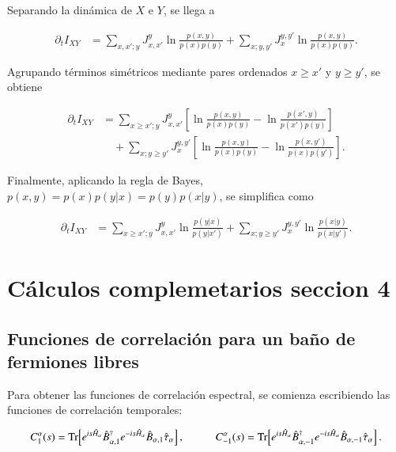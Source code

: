 \begin{appendixs}
Separando la dinámica de \(X\) e \(Y\), se llega a

\begin{align*}
    \partial_{t} I_{XY} 
    &= \sum_{x,x';y} J_{x,x'}^{y} \ln \frac{p(x,y)}{p(x)p(y)} 
    + \sum_{x;y,y'} J_{x}^{y,y'} \ln \frac{p(x,y)}{p(x)p(y)}.
\end{align*}

Agrupando términos simétricos mediante pares ordenados \(x \geq x'\) y \(y \geq y'\), se obtiene

\begin{align*}
    \partial_{t} I_{XY} 
    &= \sum_{x \geq x';y} J_{x,x'}^{y} \left[ \ln \frac{p(x,y)}{p(x)p(y)} - \ln \frac{p(x',y)}{p(x')p(y)} \right] \\
    &\quad + \sum_{x;y \geq y'} J_{x}^{y,y'} \left[ \ln \frac{p(x,y)}{p(x)p(y)} - \ln \frac{p(x,y')}{p(x)p(y')} \right].
\end{align*}

Finalmente, aplicando la regla de Bayes, \(p(x,y) = p(x)p(y|x) = p(y)p(x|y)\), se simplifica como

\begin{align*}
    \partial_{t} I_{XY} 
    &= \sum_{x \geq x';y} J_{x,x'}^{y} \ln \frac{p(y|x)}{p(y|x')} 
     + \sum_{x;y \geq y'} J_{x}^{y,y'} \ln \frac{p(x|y)}{p(x|y')}.
\end{align*}

    \label{apendix4:secondlaw}


\newpage

\section{Cálculos complemetarios seccion 4}
\label{apendixsection4}


\subsection{Funciones de correlación para un baño de fermiones libres}

Para obtener las funciones de correlación espectral, se comienza escribiendo las funciones de correlación temporales:

\begin{equation*}
    C_{1}^{\alpha}(s) = \text{Tr}\!\left[e^{is\hat{H}_{\alpha}}\hat{B}^{\dagger}_{\alpha,1}e^{-is\hat{H}_{\alpha}}\hat{B}_{\alpha,1}\hat{\tau}_{\alpha}  \right], 
    \hspace{10mm} 
    C_{-1}^{\alpha}(s) = \text{Tr}\!\left[e^{is\hat{H}_{\alpha}}\hat{B}^{\dagger}_{\alpha,-1}e^{-is\hat{H}_{\alpha}}\hat{B}_{\alpha,-1}\hat{\tau}_{\alpha}  \right].
\end{equation*}


\end{appendixs}
